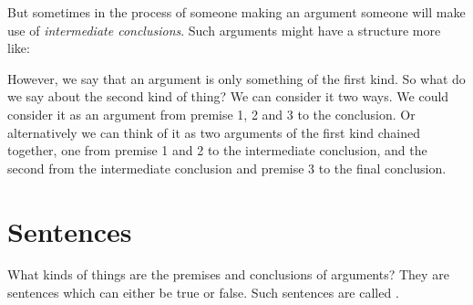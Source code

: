 But sometimes in the process of someone making an argument someone will make use of \emph{intermediate conclusions}. Such arguments might have a structure more like:
\begin{center}
\end{center}

However, we say that an argument is only something of the first kind. So what do we say about the second kind of thing? We can consider it two ways. We could consider it as an argument from premise 1, 2 and 3 to the conclusion. Or alternatively we can think of it as two arguments of the first kind chained together, one from premise 1 and 2 to the intermediate conclusion, and the second from the intermediate conclusion and premise 3 to the final conclusion.


%
%


\section{Sentences}
\label{intro.sentences}
What kinds of things are the premises and conclusions of arguments? They are sentences which can either be true or false.
Such sentences are called .

